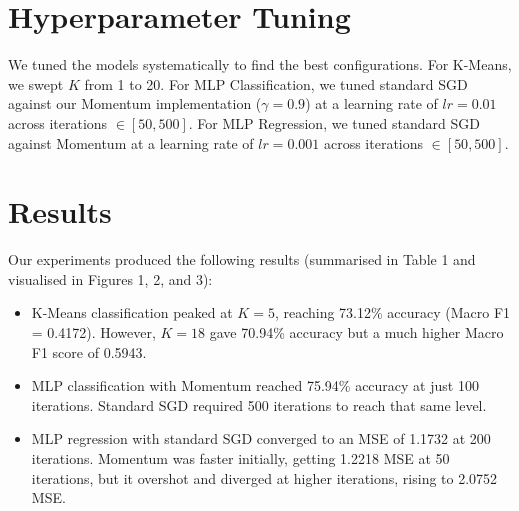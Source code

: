 \documentclass[10pt, twocolumn]{article}
\begin{document}
\section{Hyperparameter Tuning}
We tuned the models systematically to find the best configurations. For K-Means, we swept $K$ from 1 to 20. For MLP Classification, we tuned standard SGD against our Momentum implementation ($\gamma = 0.9$) at a learning rate of $lr=0.01$ across iterations $\in [50, 500]$. For MLP Regression, we tuned standard SGD against Momentum at a learning rate of $lr=0.001$ across iterations $\in [50, 500]$.

\section{Results}
Our experiments produced the following results (summarised in Table 1 and visualised in Figures 1, 2, and 3):
\begin{itemize}
    \setlength{\itemsep}{0pt}
    \setlength{\parskip}{0pt}
    \item K-Means classification peaked at $K=5$, reaching 73.12\% accuracy (Macro F1 = 0.4172). However, $K=18$ gave 70.94\% accuracy but a much higher Macro F1 score of 0.5943.
    \item MLP classification with Momentum reached 75.94\% accuracy at just 100 iterations. Standard SGD required 500 iterations to reach that same level.
    \item MLP regression with standard SGD converged to an MSE of 1.1732 at 200 iterations. Momentum was faster initially, getting 1.2218 MSE at 50 iterations, but it overshot and diverged at higher iterations, rising to 2.0752 MSE.
\end{itemize}

\begin{table}[htbp]
\centering
{}
\caption{Summary of final validation results}
\vspace{-4mm}
\end{table}
\end{document}
